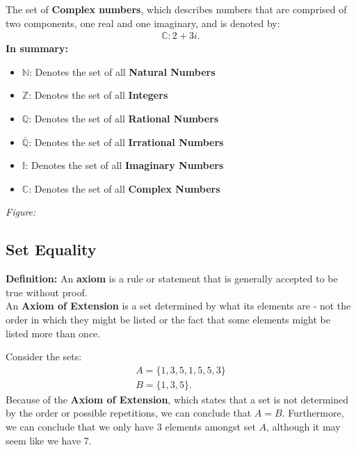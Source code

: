 \documentclass{report}
\begin{document}
    \bigbreak \noindent 
    The set of \textbf{Complex numbers}, which describes numbers that are comprised of two components, one real and one imaginary, and is denoted by:
    \begin{align*}
        \mathbb{C}: 2+3i
    .\end{align*}
    \bigbreak \noindent 
    \textbf{In summary:}
    \begin{itemize}
        \item $\mathbb{N}$: Denotes the set of all \textbf{Natural Numbers}
        \item $\mathbb{Z}$: Denotes the set of all \textbf{Integers}
        \item $\mathbb{Q}$: Denotes the set of all \textbf{Rational Numbers}
        \item $\mathbb{\bar{Q}}$: Denotes the set of all \textbf{Irrational Numbers}
        \item $\mathbb{I}$: Denotes the set of all \textbf{Imaginary Numbers}
        \item $\mathbb{C}$: Denotes the set of all \textbf{Complex Numbers}
    \end{itemize}
    \bigbreak \noindent 
    \textit{Figure:}
    \begin{figure}[ht]
        \centering
        \label{fig:figab}
    \end{figure}
    \pagebreak 
    \subsection{Set Equality}
    \bigbreak \noindent 
    \begin{mdframed}
        \textbf{Definition:} An \textbf{axiom} is a rule or statement that is generally accepted to be true without proof.\\
        An \textbf{Axiom of Extension} is a set determined by what its elements are - not the order in which they might be listed or the fact that some elements might be listed more than once.
    \end{mdframed}
    \bigbreak \noindent 
    Consider the sets:
    \begin{align*}
        A = \{1,3,5,1,5,5,3\} \\
        B = \{1,3,5\}
    .\end{align*}
    \bigbreak \noindent 
    Because of the \textbf{Axiom of Extension}, which states that a set is not determined by the order or possible repetitions, we can conclude that $A=B$.
    \bigbreak \noindent 
    Furthermore, we can conclude that we only have $3$ elements amongst set $A$, although it may seem like we have 7.
\end{document}
